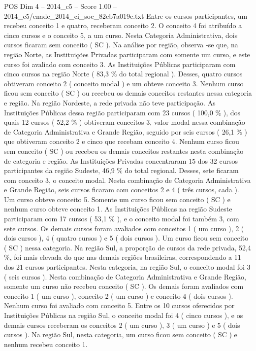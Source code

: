 \begin{textsample}{POS Dim 4 – 2014\_c5 – Score 1.00 – 2014\_c5/enade\_2014\_ci\_soc\_82cb7a019c.txt}
Entre os cursos participantes, um recebeu conceito 1 e quatro, receberam conceito 2.
O conceito 4 foi atribuído a cinco cursos e o conceito 5, a um curso.
Nesta Categoria Administrativa, dois cursos ficaram sem conceito ( SC ).
Na análise por região, observa -se que, na região Norte, as Instituições Privadas participaram com somente um curso, e este curso foi avaliado com conceito 3.
As Instituições Públicas participaram com cinco cursos na região Norte ( 83,3 \% do total regional ).
Desses, quatro cursos obtiveram conceito 2 ( conceito modal ) e um obteve conceito 3.
Nenhum curso ficou sem conceito ( SC ) ou recebeu os demais conceitos restantes nessa categoria e região.
Na região Nordeste, a rede privada não teve participação.
As Instituições Públicas dessa região participaram com 23 cursos ( 100,0 \% ), dos quais 12 cursos ( 52,2 \% ) obtiveram conceitos 3, valor modal nessa combinação de Categoria Administrativa e Grande Região, seguido por seis cursos ( 26,1 \% ) que obtiveram conceito 2 e cinco que recebam conceito 4.
Nenhum curso ficou sem conceito ( SC ) ou recebeu os demais conceitos restantes nesta combinação de categoria e região.
As Instituições Privadas concentraram 15 dos 32 cursos participantes da região Sudeste, 46,9 \% do total regional.
Desses, sete ficaram com conceito 3, o conceito modal.
Nesta combinação de Categoria Administrativa e Grande Região, seis cursos ficaram com conceitos 2 e 4 ( três cursos, cada ).
Um curso obteve conceito 5.
Somente um curso ficou sem conceito ( SC ) e nenhum curso obteve conceito 1.
As Instituições Públicas na região Sudeste participaram com 17 cursos ( 53,1 \% ), e o conceito modal foi também 3, com sete cursos.
Os demais cursos foram avaliados com conceitos 1 ( um curso ), 2 ( dois cursos ), 4 ( quatro cursos ) e 5 ( dois cursos ).
Um curso ficou sem conceito ( SC ) nessa categoria.
Na região Sul, a proporção de cursos da rede privada, 52,4 \%, foi mais elevada do que nas demais regiões brasileiras, correspondendo a 11 dos 21 cursos participantes.
Nesta categoria, na região Sul, o conceito modal foi 3 ( seis cursos ).
Nesta combinação de Categoria Administrativa e Grande Região, somente um curso não recebeu conceito ( SC ).
Os demais foram avaliados com conceito 1 ( um curso ), conceito 2 ( um curso ) e conceito 4 ( dois cursos ).
Nenhum curso foi avaliado com conceito 5.
Entre os 10 cursos oferecidos por Instituições Públicas na região Sul, o conceito modal foi 4 ( cinco cursos ), e os demais cursos receberam os conceitos 2 ( um curso ), 3 ( um curso ) e 5 ( dois cursos ).
Na região Sul, nesta categoria, um curso ficou sem conceito ( SC ) e nenhum recebeu conceito 1.

\end{textsample}
